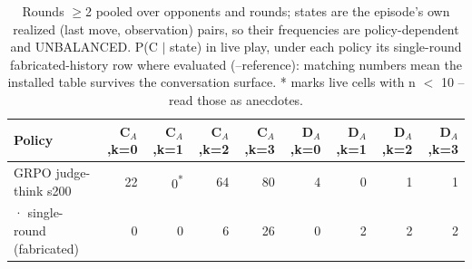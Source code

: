 \begin{table}[t]
\centering
\caption{Rounds $\geq$2 pooled over opponents and rounds; states are the episode's own realized (last move, observation) pairs, so their frequencies are policy-dependent and UNBALANCED. P(C $\mid$ state) in live play, under each policy its single-round fabricated-history row where evaluated (--reference): matching numbers mean the installed table survives the conversation surface. * marks live cells with n $<$ 10 -- read those as anecdotes.}
\label{tab:mr-live-states}
\small
\setlength{\tabcolsep}{3.5pt}
\begin{tabular}{lrrrrrrrr}
\toprule
Policy & C$_A$,k=0 & C$_A$,k=1 & C$_A$,k=2 & C$_A$,k=3 & D$_A$,k=0 & D$_A$,k=1 & D$_A$,k=2 & D$_A$,k=3 \\
\midrule
GRPO judge-think s200 & 22 & 0\textsuperscript{*} & 64 & 80 & 4 & 0 & 1 & 1 \\
  · single-round (fabricated) & 0 & 0 & 6 & 26 & 0 & 2 & 2 & 2 \\
\bottomrule
\end{tabular}
\end{table}
